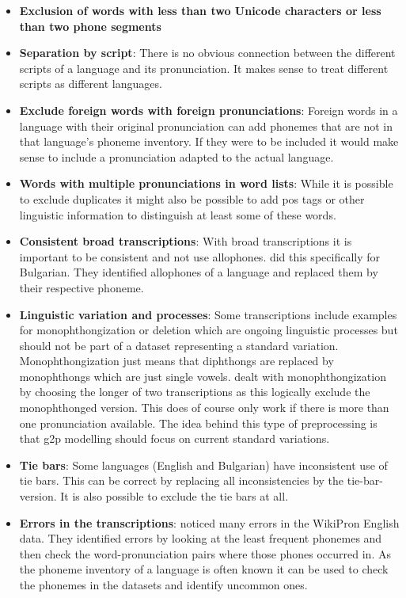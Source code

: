 \begin{itemize}
\item \textbf{Exclusion of words with less than two Unicode characters or less than two phone segments}  
\item \textbf{Separation by script}: There is no obvious connection between the different scripts of a language and its pronunciation. It makes sense to treat different scripts as different languages. 
\item \textbf{Exclude foreign words with foreign pronunciations}: Foreign words in a language with their original pronunciation can add phonemes that are not in that language's phoneme inventory. If they were to be included it would make sense to include a pronunciation adapted to the actual language.
\item \textbf{Words with multiple pronunciations in word lists}: While it is possible to exclude duplicates it might also be possible to add \ac{pos} tags or other linguistic information to distinguish at least some of these words.
\item \textbf{Consistent broad transcriptions}: With broad transcriptions it is important to be consistent and not use allophones. \cite{Ashby-Bartley.2021} did this specifically for Bulgarian. They identified allophones of a language and replaced them by their respective phoneme.
\item \textbf{Linguistic variation and processes}: Some transcriptions include examples for monophthongization or deletion which are ongoing linguistic processes but should not be part of a dataset representing a standard variation. Monophthongization just means that diphthongs are replaced by monophthongs which are just single vowels. \cite{Ashby-Bartley.2021} dealt with monophthongization by choosing the longer of two transcriptions as this logically exclude the monophthonged version. This does of course only work if there is more than one pronunciation available. The idea behind this type of preprocessing is that \ac{g2p} modelling should focus on current standard variations.
\item \textbf{Tie bars}: Some languages (English and Bulgarian) have inconsistent use of tie bars. This can be correct by replacing all inconsistencies by the tie-bar-version. It is also possible to exclude the tie bars at all.
\item \textbf{Errors in the transcriptions}: \citet{gautam.2021} noticed many errors in the WikiPron English data. They identified errors by looking at the least frequent phonemes and then check the word-pronunciation pairs where those phones occurred in. As the phoneme inventory of a language is often known it can be used to check the phonemes in the datasets and identify uncommon ones. 
\end{itemize}

